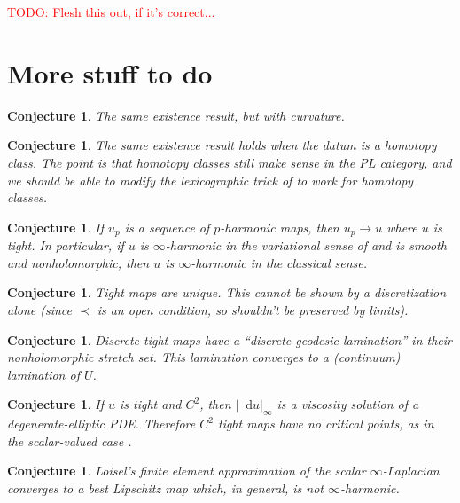 \documentclass[reqno,11pt]{amsart}
\newcommand*\dif{\mathop{}\!\mathrm{d}}
\newtheorem{conjecture}[theorem]{Conjecture}
\theoremstyle{definition}
\numberwithin{equation}{section}
\newcommand\todo[1]{\textcolor{red}{TODO: #1}}
\begin{document}
\todo{Flesh this out, if it's correct...}

\section{More stuff to do}
\begin{conjecture}
The same existence result, but with curvature.
\end{conjecture}

\begin{conjecture}
The same existence result holds when the datum is a homotopy class.
The point is that homotopy classes still make sense in the PL category, and we should be able to modify the lexicographic trick of \cite[Theorem 1.2]{Sheffield12} to work for homotopy classes.
\end{conjecture}

\begin{conjecture}
If $u_p$ is a sequence of $p$-harmonic maps, then $u_p \to u$ where $u$ is tight.
In particular, if $u$ is $\infty$-harmonic in the variational sense of \cite{daskalopoulos2022} and is smooth and nonholomorphic, then $u$ is $\infty$-harmonic in the classical sense.
\end{conjecture}

\begin{conjecture}
Tight maps are unique. This cannot be shown by a discretization alone (since $\prec$ is an open condition, so shouldn't be preserved by limits).
\end{conjecture}

\begin{conjecture}
Discrete tight maps have a ``discrete geodesic lamination'' in their nonholomorphic stretch set.
This lamination converges to a (continuum) lamination of $U$.
\end{conjecture}

\begin{conjecture}
If $u$ is tight and $C^2$, then $|\dif u|_\infty$ is a viscosity solution of a degenerate-elliptic PDE.
Therefore $C^2$ tight maps have no critical points, as in the scalar-valued case \cite{Yu2006}.
\end{conjecture}

\begin{conjecture}
Loisel's finite element approximation of the scalar $\infty$-Laplacian \cite{Loisel_2020} converges to a best Lipschitz map which, in general, is not $\infty$-harmonic.
\end{conjecture}

\printbibliography
\end{document}
